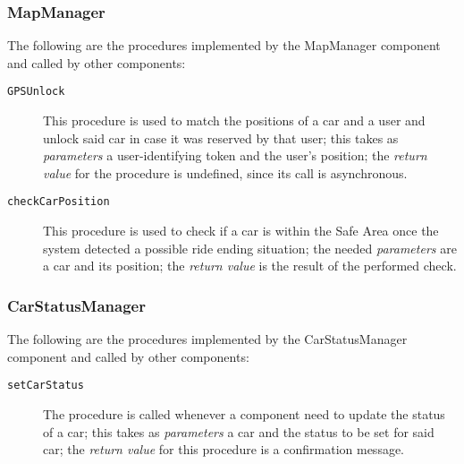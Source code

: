 \subsubsection{MapManager}
The following are the procedures implemented by the MapManager component and called by other components:
\begin{description}
\item[\texttt{GPSUnlock}] This procedure is used to match the positions of a car and a user and unlock said car in case it was reserved by that user; this takes as \textit{parameters} a user-identifying token and the user's position; the \textit{return value} for the procedure is undefined, since its call is asynchronous.
\item[\texttt{checkCarPosition}] This procedure is used to check if a car is within the Safe Area once the system detected a possible ride ending situation; the needed \textit{parameters} are a car and its position; the \textit{return value} is the result of the performed check.
\end{description}
\subsubsection{CarStatusManager}
The following are the procedures implemented by the CarStatusManager component and called by other components:
\begin{description}
\item[\texttt{setCarStatus}] The procedure is called whenever a component need to update the status of a car; this takes as \textit{parameters} a car and the status to be set for said car; the \textit{return value} for this procedure is a confirmation message.
\end{description}
